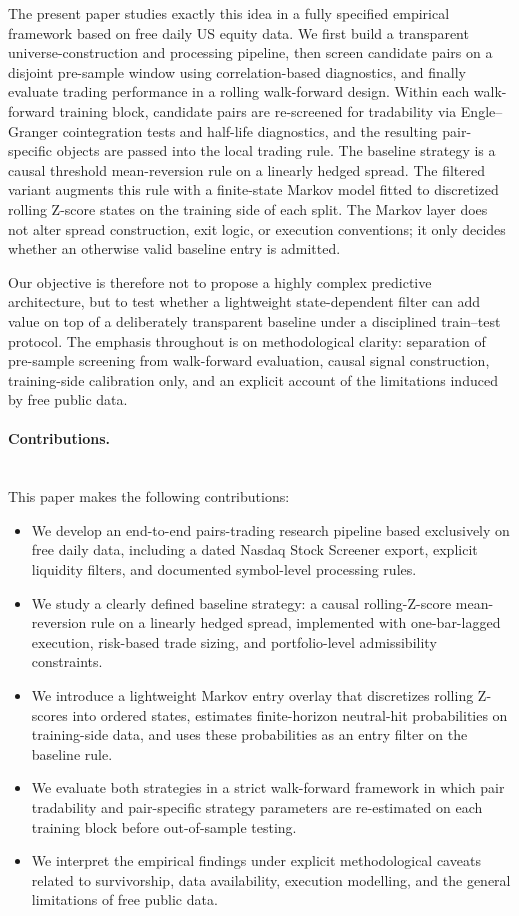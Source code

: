 \documentclass[11pt,a4paper]{article}
\begin{document}
The present paper studies exactly this idea in a fully specified empirical framework based on free daily US equity data. We first build a transparent universe-construction and processing pipeline, then screen candidate pairs on a disjoint pre-sample window using correlation-based diagnostics, and finally evaluate trading performance in a rolling walk-forward design. Within each walk-forward training block, candidate pairs are re-screened for tradability via Engle--Granger cointegration tests and half-life diagnostics, and the resulting pair-specific objects are passed into the local trading rule. The baseline strategy is a causal threshold mean-reversion rule on a linearly hedged spread. The filtered variant augments this rule with a finite-state Markov model fitted to discretized rolling Z-score states on the training side of each split. The Markov layer does not alter spread construction, exit logic, or execution conventions; it only decides whether an otherwise valid baseline entry is admitted.

Our objective is therefore not to propose a highly complex predictive architecture, but to test whether a lightweight state-dependent filter can add value on top of a deliberately transparent baseline under a disciplined train--test protocol. The emphasis throughout is on methodological clarity: separation of pre-sample screening from walk-forward evaluation, causal signal construction, training-side calibration only, and an explicit account of the limitations induced by free public data.

\paragraph{Contributions.}\mbox{}\\
This paper makes the following contributions:
\begin{itemize}[leftmargin=*, itemsep=2pt, topsep=2pt]
  \item We develop an end-to-end pairs-trading research pipeline based exclusively on free daily data, including a dated Nasdaq Stock Screener export, explicit liquidity filters, and documented symbol-level processing rules.
  \item We study a clearly defined baseline strategy: a causal rolling-Z-score mean-reversion rule on a linearly hedged spread, implemented with one-bar-lagged execution, risk-based trade sizing, and portfolio-level admissibility constraints.
  \item We introduce a lightweight Markov entry overlay that discretizes rolling Z-scores into ordered states, estimates finite-horizon neutral-hit probabilities on training-side data, and uses these probabilities as an entry filter on the baseline rule.
  \item We evaluate both strategies in a strict walk-forward framework in which pair tradability and pair-specific strategy parameters are re-estimated on each training block before out-of-sample testing.
  \item We interpret the empirical findings under explicit methodological caveats related to survivorship, data availability, execution modelling, and the general limitations of free public data.
\end{itemize}
\end{document}
